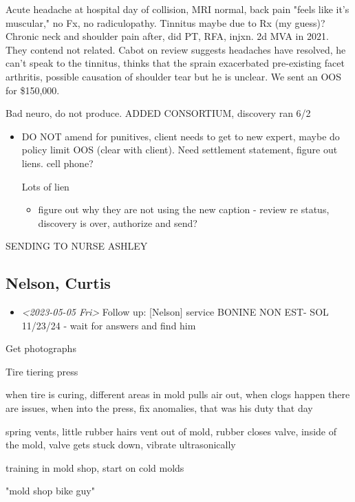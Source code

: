 \documentclass[11pt]{article}
\begin{document}
Acute headache at hospital day of collision, MRI normal, back pain "feels like it's muscular," no Fx, no radiculopathy. Tinnitus maybe due to Rx (my guess)? Chronic neck and shoulder pain after, did PT, RFA, injxn. 2d MVA in 2021. They contend not related. Cabot on review suggests headaches have resolved, he can't speak to the tinnitus, thinks that the sprain exacerbated pre-existing facet arthritis, possible causation of shoulder tear but he is unclear. We sent an OOS for \$150,000. 

Bad neuro, do not produce. ADDED CONSORTIUM, discovery ran 6/2

\begin{itemize}
\item DO NOT amend for punitives, client needs to get to new expert, maybe do policy limit OOS (clear with client). Need settlement statement, figure out liens. cell phone?

Lots of lien

\begin{itemize}
\item figure out why they are not using the new caption - review re status, discovery is over, authorize and send?
\end{itemize}
\end{itemize}

SENDING TO NURSE ASHLEY

\subsection*{Nelson, Curtis}
\label{sec:orgd34c01a}

\begin{itemize}
\item \textit{<2023-05-05 Fri> } Follow up: [Nelson] service BONINE NON EST- SOL 11/23/24 - wait for answers and find him
\end{itemize}

Get photographs

Tire tiering press

when tire is curing, different areas in mold pulls air out, when clogs happen there are issues, when into the press, fix anomalies, that was his duty that day

spring vents, little rubber hairs vent out of mold, rubber closes valve, inside of the mold, valve gets stuck down, vibrate ultrasonically

training in mold shop, start on cold molds

"mold shop bike guy"
\end{document}
